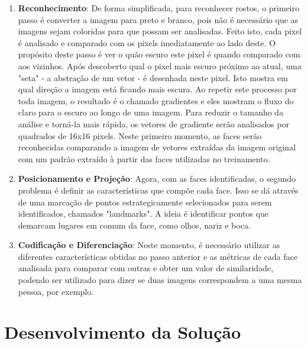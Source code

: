 \documentclass[twoside,conference,a4paper]{IEEEtran}
\begin{document}
\begin{enumerate}
    \item \textbf{Reconhecimento}: De forma simplificada, para reconhecer rostos, o primeiro passo é converter a imagem para preto e branco, pois não é necessário que as imagens sejam coloridas para que possam ser analisadas. Feito isto, cada pixel é analisado e comparado com os pixels imediatamente ao lado deste. O propósito deste passo é ver o quão escuro este pixel é quando comparado com aos vizinhos. Após descoberto qual o pixel mais escuro próximo ao atual, uma "seta" - a abstração de um vetor - é desenhada neste pixel. Isto mostra em qual direção a imagem está ficando mais escura. Ao repetir este processo por toda imagem, o resultado é o chamado gradientes e eles mostram o fluxo do claro para o escuro ao longo de uma imagem. Para reduzir o tamanho da análise e torná-la mais rápida, os vetores de gradiente serão analisados por quadrados de 16x16 pixels. Neste primeiro momento, as faces serão reconhecidas comparando a imagem de vetores extraídas da imagem original com um padrão extraído à partir das faces utilizadas no treinamento.

\item \textbf{Posicionamento e Projeção}: Agora, com as faces identificadas, o segundo problema é definir as características que compõe cada face. Isso se dá através de uma marcação de pontos estrategicamente selecionados para serem identificados, chamados "landmarks". A ideia é identificar pontos que demarcam lugares em comum da face, como olhos, nariz e boca.

\item \textbf{Codificação e Diferenciação}: Neste momento, é necessário utilizar as diferentes características obtidas no passo anterior e as métricas de cada face analisada para comparar com outras e obter um valor de similaridade, podendo ser utilizado para dizer se duas imagens correspondem a uma mesma pessoa, por exemplo.

\end{enumerate}

\section{Desenvolvimento da Solução}
\end{document}
